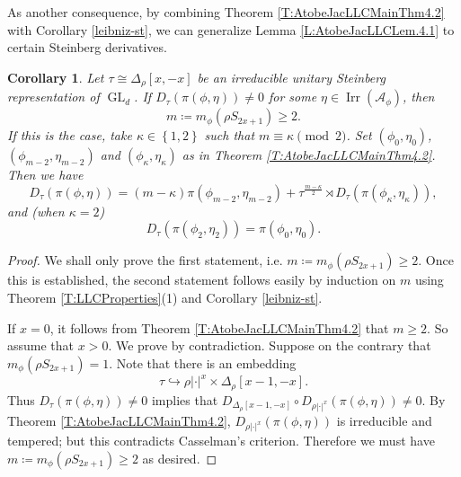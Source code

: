 \documentclass[11pt,letterpaper]{amsart}
\theoremstyle{plain}
\newcounter{theorem}[section]
\numberwithin{theorem}{section}
\numberwithin{equation}{subsection}
\newtheorem{Cor}[theorem]{Corollary}
\theoremstyle{remark}
\newcommand{\GL}{\operatorname{GL}}
\newcommand{\Irr}{\operatorname{Irr}}
\def\calA{\mathcal{A}}
\begin{document}
\vskip 5pt

As another consequence, by combining Theorem \ref{T:AtobeJacLLCMainThm4.2} with Corollary \ref{leibniz-st}, we can generalize Lemma \ref{L:AtobeJacLLCLem.4.1} to certain Steinberg derivatives.

\begin{Cor}\label{C:UnitarySteinbergDerivative}
Let $\tau\cong\Delta_\rho\left[x,-x\right]$ be an irreducible unitary Steinberg representation of $\GL_d$. If $D_\tau\left(\pi\left(\phi,\eta\right)\right)\neq 0$ for some $\eta\in\Irr\left(\calA_\phi\right)$, then
\[
    m\coloneqq m_\phi\left(\rho S_{2x+1}\right) \geq 2.
\]
If this is the case, take $\kappa\in\left\{1,2\right\}$ such that $m\equiv \kappa\pmod2$. Set $\left(\phi_0,\eta_0\right)$, $\left(\phi_{m-2},\eta_{m-2}\right)$ and $\left(\phi_\kappa,\eta_\kappa\right)$ as in Theorem \ref{T:AtobeJacLLCMainThm4.2}. Then we have
\[
    D_\tau\left(\pi\left(\phi,\eta\right)\right) = \left(m-\kappa\right)\pi\left(\phi_{m-2},\eta_{m-2}\right) + \tau^{\frac{m-\kappa}{2}}\rtimes D_\tau\left(\pi\left(\phi_\kappa,\eta_\kappa\right)\right),
\]
and (when $\kappa=2$)
\[
    D_\tau\left(\pi\left(\phi_2,\eta_2\right)\right) = \pi\left(\phi_0,\eta_0\right).
\]
\end{Cor}

\vskip 5pt

\begin{proof}
We shall only prove the first statement, i.e. $m\coloneqq m_\phi\left(\rho S_{2x+1}\right) \geq 2$. Once this is established, the second statement follows easily by induction on $m$ using Theorem \ref{T:LLCProperties}(1) and Corollary \ref{leibniz-st}. 

\vskip 5pt

If $x=0$, it follows from Theorem \ref{T:AtobeJacLLCMainThm4.2} that $m\geq 2$. So assume that $x>0$. We prove by contradiction. Suppose on the contrary that $m_\phi\left(\rho S_{2x+1}\right)=1$. Note that there is an embedding
\[
    \tau \hookrightarrow \rho|\cdot|^x\times \Delta_\rho\left[x-1,-x\right].
\]
Thus $D_\tau\left(\pi\left(\phi,\eta\right)\right)\neq 0$ implies that $D_{\Delta_\rho\left[x-1,-x\right]}\circ D_{\rho|\cdot|^x}\left(\pi\left(\phi,\eta\right)\right)\neq 0$. By Theorem \ref{T:AtobeJacLLCMainThm4.2}, $D_{\rho|\cdot|^x}\left(\pi\left(\phi,\eta\right)\right)$ is irreducible and tempered; but this contradicts Casselman's criterion. Therefore we must have $m\coloneqq m_\phi\left(\rho S_{2x+1}\right) \geq 2$ as desired.

\end{proof}
\end{document}
